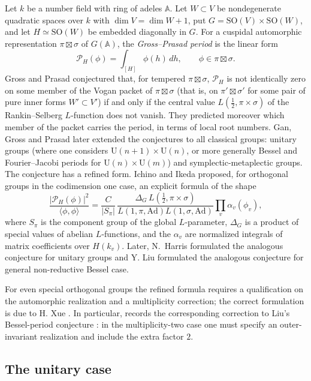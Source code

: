 \documentclass[11pt,oneside,notitlepage]{book}
\numberwithin{equation}{section}
\theoremstyle{plain}
\theoremstyle{definition}
\newcommand{\A}{\mathbb{A}}
\newcommand{\SO}{\mathrm{SO}}
\begin{document}
Let $k$ be a number field with ring of adeles $\A$. Let $W\subset V$ be nondegenerate quadratic spaces over $k$ with $\dim V=\dim W+1$, put $G=\SO(V)\times\SO(W)$, and let $H\simeq\SO(W)$ be embedded diagonally in $G$. For a cuspidal automorphic representation $\pi\boxtimes\sigma$ of $G(\A)$, the \emph{Gross--Prasad period} is the linear form
\[\mathcal P_H(\phi)=\int_{[H]}\phi(h)\,dh,\qquad\phi\in\pi\boxtimes\sigma .\]
Gross and Prasad \cite{GP92,GP94} conjectured that, for tempered $\pi\boxtimes\sigma$, $\mathcal P_H$ is not identically zero on some member of the Vogan packet of $\pi\boxtimes\sigma$ (that is, on $\pi'\boxtimes\sigma'$ for some pair of pure inner forms $W'\subset V'$) if and only if the central value $L(\frac12,\pi\times\sigma)$ of the Rankin--Selberg $L$-function does not vanish. They predicted moreover which member of the packet carries the period, in terms of local root numbers. Gan, Gross and Prasad \cite{GGP} later extended the conjectures to all classical groups: unitary groups (where one considers $\mathrm U(n+1)\times\mathrm U(n)$, or more generally Bessel and Fourier--Jacobi periods for $\mathrm U(n)\times\mathrm U(m)$) and symplectic-metaplectic groups. The conjecture has a refined form. Ichino and Ikeda \cite{II} proposed, for orthogonal groups in the codimension one case, an explicit formula of the shape
\[\frac{|\mathcal P_H(\phi)|^2}{\langle\phi,\phi\rangle}=\frac{C}{|S_\pi|}\,\frac{\Delta_G\,L(\frac12,\pi\times\sigma)}{L(1,\pi,\mathrm{Ad})L(1,\sigma,\mathrm{Ad})}\prod_v\alpha_v(\phi_v),\]
where $S_\pi$ is the component group of the global $L$-parameter, $\Delta_G$ is a product of special values of abelian $L$-functions, and the $\alpha_v$ are normalized integrals of matrix coefficients over $H(k_v)$. Later, N.~Harris \cite{Harris} formulated the analogous conjecture for unitary groups and Y. Liu \cite{Liu} formulated the analogous conjecture for general non-reductive Bessel case.

For even special orthogonal groups the refined formula requires a qualification on the automorphic realization and a multiplicity correction;  the correct formulation is due to H. Xue \cite[Conjecture~6.2.1]{XueFJ}. In particular, \cite[Remark~6.2.2]{XueFJ} records the corresponding correction to Liu's Bessel-period conjecture \cite[Conjecture~2.5]{Liu}: in the multiplicity-two case one must specify an outer-invariant realization and include the extra factor $2$. 


\subsection*{The unitary case}
\end{document}
